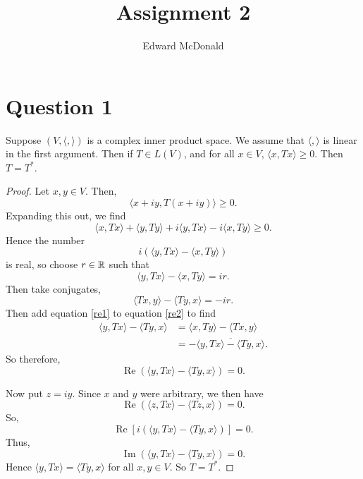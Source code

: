 \documentclass{unswmaths}
\begin{document}
\subject{Functional Analysis}
\author{Edward McDonald}
\title{Assignment 2}


\newcommand{\Real}{\operatorname{Re}}
\newcommand{\Img}{\operatorname{Im}}
\newcommand{\lan}{\langle}
\newcommand{\ran}{\rangle}
\newcommand{\Proj}{\mathbb{P}_+}
\newcommand{\isom}{\cong}


\unswtitle{}

\section*{Question 1}
\begin{theorem}
    Suppose $(V,\lan,\ran)$ is a complex inner product space. We assume that $\lan,\ran$
    is linear in the first argument. Then
    if $T \in L(V)$, and for all $x \in V$, $\lan x,Tx\ran \geq 0$. Then $T = T^*$.
\end{theorem}
\begin{proof}
    Let $x,y \in V$. Then,
    \begin{equation*}
        \lan x+iy,T(x+iy)\ran \geq 0.
    \end{equation*}
    Expanding this out, we find
    \begin{equation*}
        \lan x,Tx\ran + \lan y,Ty\ran + i\lan y,Tx\ran-i\lan x,Ty\ran \geq 0. 
    \end{equation*}
    Hence the number
    \begin{equation*}
        i(\lan y,Tx\ran-\lan x,Ty\ran)
    \end{equation*}
    is real, so choose $r \in \mathbb{R}$ such that
    \begin{equation}
    \label{re1}
        \lan y,Tx\ran -\lan x,Ty\ran = ir.
    \end{equation}
    Then take conjugates,
    \begin{equation}
    \label{re2}
        \lan Tx,y\ran-\lan Ty,x\ran = -ir.
    \end{equation}
    Then add equation \ref{re1} to equation \ref{re2} to find
    \begin{align*}
        \lan y,Tx\ran - \lan Ty,x\ran &= \lan x,Ty\ran-\lan Tx,y\ran\\
        &= -\overline{\lan y,Tx\ran - \lan Ty,x\ran}.
    \end{align*}
    So therefore,
    \begin{equation*}
        \Real(\lan y,Tx\ran - \lan Ty,x\ran) = 0.
    \end{equation*}
    
    Now put $z = iy$. Since $x$ and $y$ were arbitrary, we then have
    \begin{equation*}
        \Real(\lan z,Tx\ran - \lan Tz,x\ran) = 0.
    \end{equation*}
    So,
    \begin{equation*}
        \Real[i(\lan y,Tx\ran-\lan Ty,x\ran)] = 0.
    \end{equation*}
    Thus,
    \begin{equation*}
        \Img(\lan y,Tx\ran-\lan Ty,x\ran) = 0.
    \end{equation*}
    Hence $\lan y,Tx\ran = \lan Ty,x\ran$ for all $x,y \in V$. So $T = T^*$.
\end{proof}
\end{document}
